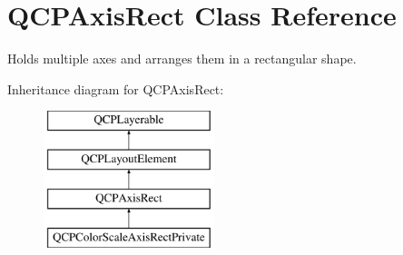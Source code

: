 \hypertarget{classQCPAxisRect}{\section{\-Q\-C\-P\-Axis\-Rect \-Class \-Reference}
\label{classQCPAxisRect}
}


\-Holds multiple axes and arranges them in a rectangular shape.  


\-Inheritance diagram for \-Q\-C\-P\-Axis\-Rect\-:\begin{figure}[H]
\begin{center}
\leavevmode
\includegraphics[height=4.000000cm]{classQCPAxisRect}
\end{center}
\end{figure}
